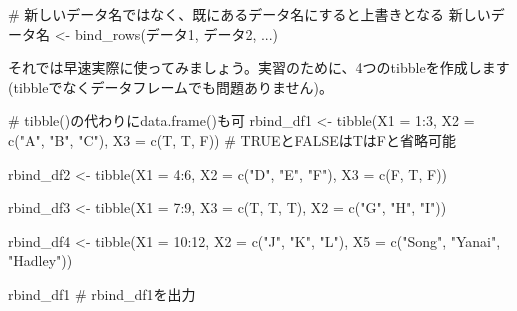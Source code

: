 \documentclass[
  a4paper,
  pandoc,
  ja=standard,
  jafont=haranoaji]{bxjsbook}
\newenvironment{Shaded}{\begin{snugshade}}{\end{snugshade}}
\newcommand{\AttributeTok}[1]{\textcolor[rgb]{0.00,0.48,0.65}{#1}}
\newcommand{\CommentTok}[1]{\textcolor[rgb]{0.37,0.37,0.37}{#1}}
\newcommand{\DecValTok}[1]{\textcolor[rgb]{0.68,0.00,0.00}{#1}}
\newcommand{\FunctionTok}[1]{\textcolor[rgb]{0.28,0.35,0.67}{#1}}
\newcommand{\NormalTok}[1]{\textcolor[rgb]{0.00,0.48,0.65}{#1}}
\newcommand{\OtherTok}[1]{\textcolor[rgb]{0.00,0.48,0.65}{#1}}
\newcommand{\SpecialCharTok}[1]{\textcolor[rgb]{0.37,0.37,0.37}{#1}}
\newcommand{\StringTok}[1]{\textcolor[rgb]{0.13,0.47,0.30}{#1}}
\begin{document}
\begin{Shaded}
\begin{Highlighting}[numbers=left,,]
\CommentTok{\# 新しいデータ名ではなく、既にあるデータ名にすると上書きとなる}
\NormalTok{新しいデータ名 }\OtherTok{\textless{}{-}}  \FunctionTok{bind\_rows}\NormalTok{(データ1, データ2, ...)}
\end{Highlighting}
\end{Shaded}

それでは早速実際に使ってみましょう。実習のために、4つのtibbleを作成します
(tibbleでなくデータフレームでも問題ありません)。

\begin{Shaded}
\begin{Highlighting}[numbers=left,,]
\CommentTok{\# tibble()の代わりにdata.frame()も可}
\NormalTok{rbind\_df1 }\OtherTok{\textless{}{-}} \FunctionTok{tibble}\NormalTok{(}\AttributeTok{X1 =} \DecValTok{1}\SpecialCharTok{:}\DecValTok{3}\NormalTok{,}
                    \AttributeTok{X2 =} \FunctionTok{c}\NormalTok{(}\StringTok{"A"}\NormalTok{, }\StringTok{"B"}\NormalTok{, }\StringTok{"C"}\NormalTok{),}
                    \AttributeTok{X3 =} \FunctionTok{c}\NormalTok{(T, T, F)) }\CommentTok{\# TRUEとFALSEはTはFと省略可能}

\NormalTok{rbind\_df2 }\OtherTok{\textless{}{-}} \FunctionTok{tibble}\NormalTok{(}\AttributeTok{X1 =} \DecValTok{4}\SpecialCharTok{:}\DecValTok{6}\NormalTok{,}
                    \AttributeTok{X2 =} \FunctionTok{c}\NormalTok{(}\StringTok{"D"}\NormalTok{, }\StringTok{"E"}\NormalTok{, }\StringTok{"F"}\NormalTok{),}
                    \AttributeTok{X3 =} \FunctionTok{c}\NormalTok{(F, T, F))}

\NormalTok{rbind\_df3 }\OtherTok{\textless{}{-}} \FunctionTok{tibble}\NormalTok{(}\AttributeTok{X1 =} \DecValTok{7}\SpecialCharTok{:}\DecValTok{9}\NormalTok{,}
                    \AttributeTok{X3 =} \FunctionTok{c}\NormalTok{(T, T, T),}
                    \AttributeTok{X2 =} \FunctionTok{c}\NormalTok{(}\StringTok{"G"}\NormalTok{, }\StringTok{"H"}\NormalTok{, }\StringTok{"I"}\NormalTok{))}

\NormalTok{rbind\_df4 }\OtherTok{\textless{}{-}} \FunctionTok{tibble}\NormalTok{(}\AttributeTok{X1 =} \DecValTok{10}\SpecialCharTok{:}\DecValTok{12}\NormalTok{,}
                    \AttributeTok{X2 =} \FunctionTok{c}\NormalTok{(}\StringTok{"J"}\NormalTok{, }\StringTok{"K"}\NormalTok{, }\StringTok{"L"}\NormalTok{),}
                    \AttributeTok{X5 =} \FunctionTok{c}\NormalTok{(}\StringTok{"Song"}\NormalTok{, }\StringTok{"Yanai"}\NormalTok{, }\StringTok{"Hadley"}\NormalTok{))}

\NormalTok{rbind\_df1 }\CommentTok{\# rbind\_df1を出力}
\end{Highlighting}
\end{Shaded}
\end{document}
